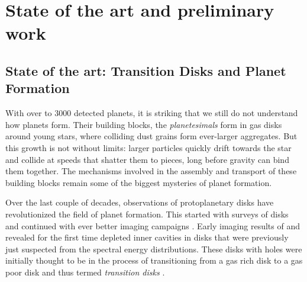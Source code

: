 \documentclass[10pt,fleqn,twoside]{article}
\begin{document}

\section{State of the art and preliminary work}

\subsection*{State of the art: Transition Disks and Planet Formation}

With over to 3000 detected planets, it is striking that we still do
not understand how planets form. Their building blocks, the
\textit{planetesimals} form in gas disks around young stars, where
colliding dust grains form ever-larger aggregates. But this growth is
not without limits: larger particles quickly drift towards the star
and collide at speeds that shatter them to pieces, long before gravity
can bind them together. The mechanisms involved in the assembly and
transport of these building blocks remain some of the biggest
mysteries of planet formation.

Over the last couple of decades, observations of protoplanetary disks
have revolutionized the field of planet formation. This started with
surveys of disks \citep[see the review of][]{2011ARA&A..49...67W} and
continued with ever better imaging campaigns \citep[e.g.,][and many
others]{2007ApJ...659..705A,2009ApJ...704..496B}.
Early imaging results of \citet{2008ApJ...675L.109B} and
\citet{2009ApJ...704..496B} revealed for the first time depleted inner
cavities in disks that were previously just suspected from the
spectral energy distributions. These disks with holes were initially
thought to be in the process of transitioning from a gas rich disk
to a gas poor disk \cite[e.g.,][]{2001MNRAS.328..485C} and thus termed
\textit{transition disks} \citep[see][and references
therein]{2014prpl.conf..497E,2014prpl.conf..475A}.
\end{document}
